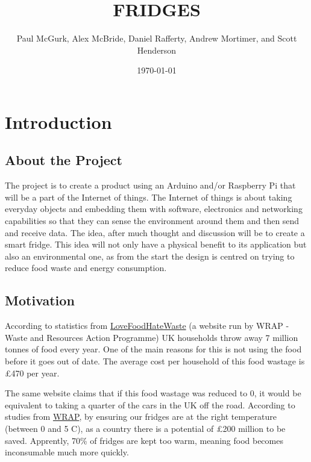 \documentclass[10pt]{article}
\title{FRIDGES}
\author{Paul McGurk, Alex McBride, Daniel Rafferty, Andrew Mortimer, and Scott Henderson}
\date{\today}
\begin{document}
\begin{titlepage}
\maketitle
\end{titlepage}

\linespread{1.15} %
\renewcommand{\arraystretch}{1.2} %

\tableofcontents

\newpage
\section{Introduction}

\subsection{About the Project}
The project is to create a product using an Arduino and/or Raspberry Pi that will be a part of the Internet of things. The Internet of things is about taking everyday objects and embedding them with software, electronics and networking capabilities so that they can sense the environment around them and then send and receive data. The idea, after much thought and discussion will be to create a smart fridge. This idea will not only have a physical benefit to its application but also an environmental one, as from the start the design is centred on trying to reduce food waste and energy consumption.

\subsection{Motivation}
According to statistics from \href{http://www.lovefoodhatewaste.com/content/facts-about-food-waste-1}{LoveFoodHateWaste} (a website run by WRAP - Waste and Resources Action Programme) UK households throw away 7 million tonnes of food every year. One of the main reasons for this is not using the food before it goes out of date. The average cost per household of this food wastage is \pounds 470 per year.


The same website claims that if this food wastage was reduced to 0, it would be equivalent to taking a quarter of the cars in the UK off the road. According to studies from \href{http://www.lovefoodhatewaste.com/content/love-your-fridge-and-waste-less}{WRAP}, by ensuring our fridges are at the right temperature (between 0 and 5 \degree C), as a country there is a potential of \pounds 200 million to be saved. Apprently, 70\% of fridges are kept too warm, meaning food becomes inconsumable much more quickly.
\end{document}

